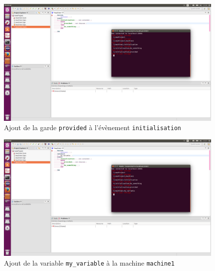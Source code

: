 \begin{figure}[H]
    \centering
    \includegraphics{pictures/rodinCommunication6.png}
    \caption{Ajout de la garde \texttt{provided} à l'évènement \texttt{initialisation}}
    \label{fig:rodinCommunication6}
\end{figure}

\begin{figure}[H]
    \centering
    \includegraphics{pictures/rodinCommunication7.png}
    \caption{Ajout de la variable \texttt{my\_variable} à la machine \texttt{machine1}}
    \label{fig:rodinCommunication7}
\end{figure}
